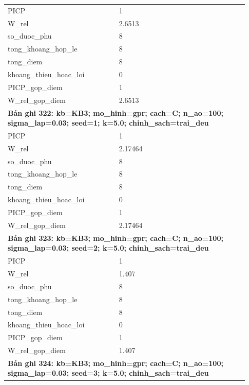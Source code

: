 \begin{longtable}{p{0.43\linewidth}p{0.50\linewidth}}
PICP & 1 \\
W\_\allowbreak rel & 2.6513 \\
so\_\allowbreak duoc\_\allowbreak phu & 8 \\
tong\_\allowbreak khoang\_\allowbreak hop\_\allowbreak le & 8 \\
tong\_\allowbreak diem & 8 \\
khoang\_\allowbreak thieu\_\allowbreak hoac\_\allowbreak loi & 0 \\
PICP\_\allowbreak gop\_\allowbreak diem & 1 \\
W\_\allowbreak rel\_\allowbreak gop\_\allowbreak diem & 2.6513 \\
\midrule
\multicolumn{2}{p{0.95\linewidth}}{\textbf{Bản ghi 322: kb=KB3; mo\_hinh=gpr; cach=C; n\_ao=100; sigma\_lap=0.03; seed=1; k=5.0; chinh\_sach=trai\_deu}} \\
PICP & 1 \\
W\_\allowbreak rel & 2.17464 \\
so\_\allowbreak duoc\_\allowbreak phu & 8 \\
tong\_\allowbreak khoang\_\allowbreak hop\_\allowbreak le & 8 \\
tong\_\allowbreak diem & 8 \\
khoang\_\allowbreak thieu\_\allowbreak hoac\_\allowbreak loi & 0 \\
PICP\_\allowbreak gop\_\allowbreak diem & 1 \\
W\_\allowbreak rel\_\allowbreak gop\_\allowbreak diem & 2.17464 \\
\midrule
\multicolumn{2}{p{0.95\linewidth}}{\textbf{Bản ghi 323: kb=KB3; mo\_hinh=gpr; cach=C; n\_ao=100; sigma\_lap=0.03; seed=2; k=5.0; chinh\_sach=trai\_deu}} \\
PICP & 1 \\
W\_\allowbreak rel & 1.407 \\
so\_\allowbreak duoc\_\allowbreak phu & 8 \\
tong\_\allowbreak khoang\_\allowbreak hop\_\allowbreak le & 8 \\
tong\_\allowbreak diem & 8 \\
khoang\_\allowbreak thieu\_\allowbreak hoac\_\allowbreak loi & 0 \\
PICP\_\allowbreak gop\_\allowbreak diem & 1 \\
W\_\allowbreak rel\_\allowbreak gop\_\allowbreak diem & 1.407 \\
\midrule
\multicolumn{2}{p{0.95\linewidth}}{\textbf{Bản ghi 324: kb=KB3; mo\_hinh=gpr; cach=C; n\_ao=100; sigma\_lap=0.03; seed=3; k=5.0; chinh\_sach=trai\_deu}} \\

\end{longtable}
